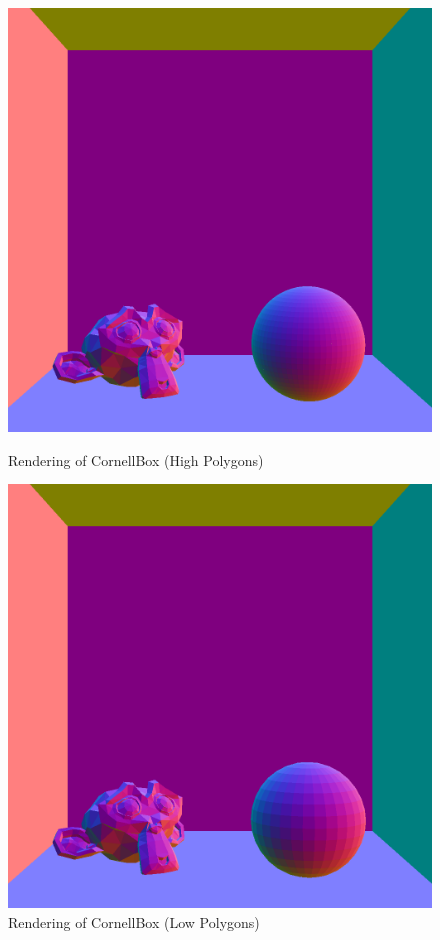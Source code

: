 \documentclass[a4paper]{article}
\begin{document}
\begin{figure}[htb]
  \begin{minipage}[t]{.4\textwidth}
      \centering
      \includegraphics[width=\textwidth]{q2/CornellBox/scene_hi_poly.png}
      \caption{Rendering of CornellBox (High Polygons)}
  \end{minipage}
  \hfill
  \begin{minipage}[t]{.4\textwidth}
      \centering
      \includegraphics[width=\textwidth]{q2/CornellBox/scene_lo_poly.png}
      \caption{Rendering of CornellBox (Low Polygons)}
  \end{minipage}
\end{figure}
\end{document}

